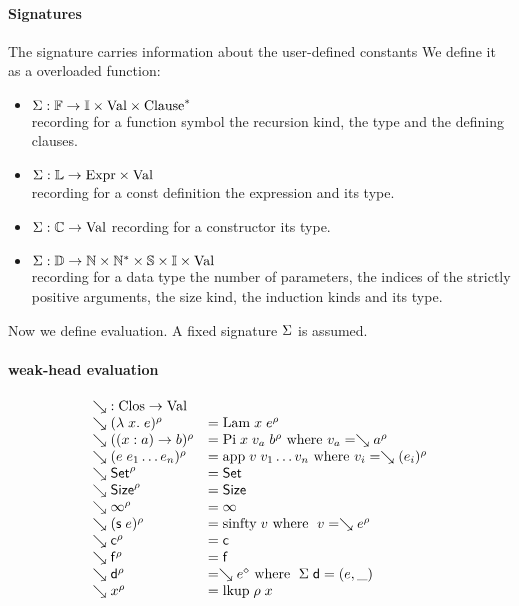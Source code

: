 \paragraph*{Signatures}
The signature carries information about the user-defined constants
We define it as a overloaded function:
\begin{itemize}
\item
$ \mathrm{\Sigma} : \mathbb{F} \rightarrow \mathbb{I} \times \mathrm{Val} \times {\mathrm{Clause}}^{\ast}$\\
recording for a function symbol the recursion kind, the type and the defining clauses.
\item
$ \mathrm{\Sigma} : \mathbb{L} \rightarrow \mathrm{Expr} \times \mathrm{Val} $ \\
recording for a const definition the expression and its type. 
\item
$ \mathrm{\Sigma} : \mathbb{C} \rightarrow \mathrm{Val} $
recording for a constructor its type.
\item
$ \mathrm{\Sigma} : \mathbb{D} \rightarrow \mathbb{N} \times {\mathbb{N}}^{\ast} \times \mathbb{S} \times \mathbb{I} \times \mathrm{Val} $\\
recording for a data type the number of parameters, the indices of the strictly positive arguments,
the size kind, the induction kinds and its type.
\end{itemize}
Now we define evaluation. A fixed signature $\mathrm{\Sigma}$ is assumed.
\paragraph*{weak-head evaluation}


\[
\begin{array}{ll}
\multicolumn{2}{l}{\wh \; : \Clos \ra \Val}\\
\wh \clp{\lam{x}{e}}{\rho} & = \vlam \; x \; \cl{e}{\rho} \\
\wh \clp{\EPi{x}{a}{b}}{\rho} &= \vpi \; x \; v_a \; \cl{b}{\rho} \mbox{ where } v_a = \wh \cl{a}{\rho} \\
\wh \clp{e \; e_1 \ldots e_n}{\rho} &= \ap \; v \; v_1 \ldots v_n \mbox{ where } v_i = \wh \cl{(e_i)}{\rho} \\
\wh \cl{\Set}{\rho} & = \Set \\ 
\wh \cl{\Size}{\rho} & = \Size \\
\wh \cl{\infty}{\rho} & = \infty  \\
\wh \clp{\s e}{\rho} & = \sinfty \; v \mbox{ where } \; v = \wh \cl{e}{\rho} \\ 
\wh \cl{\cc}{\rho} & = \cc  \\
\wh \cl{\ff}{\rho} & = \ff \\
\wh \cl{\dd}{\rho} & = \wh \cl{e}{\diamond} \mbox{ where } \; \Sig \; \dd = (e,\_)\\
\wh \cl{x}{\rho} & = \lkup \; \rho \; x \\
\end{array}
\]

